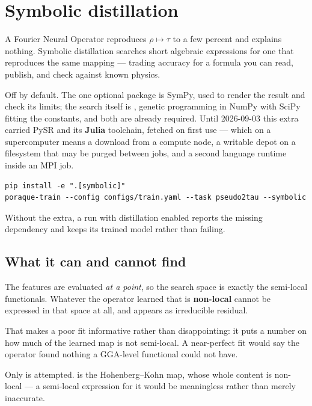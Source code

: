 \chapter{Symbolic distillation}
\label{ch:symbolic}

A Fourier Neural Operator reproduces $\rho \mapsto \tau$ to a few percent and
explains nothing. Symbolic distillation searches short algebraic expressions
for one that reproduces the same mapping --- trading accuracy for a formula you
can read, publish, and check against known physics.

\begin{pnote}
Off by default. The one optional package is SymPy, used to render the result and
check its limits; the search itself is , genetic programming
in NumPy with SciPy fitting the constants, and both are already required.
Until 2026-09-03 this extra carried PySR and its \textbf{Julia} toolchain,
fetched on first use --- which on a supercomputer means a download from a
compute node, a writable depot on a filesystem that may be purged between jobs,
and a second language runtime inside an MPI job.
\end{pnote}

\begin{lstlisting}
pip install -e ".[symbolic]"
poraque-train --config configs/train.yaml --task pseudo2tau --symbolic
\end{lstlisting}

Without the extra, a run with distillation enabled reports the missing
dependency and keeps its trained model rather than failing.

\section{What it can and cannot find}

The features are evaluated \emph{at a point}, so the search space is exactly
the semi-local functionals. Whatever the operator learned that is
\textbf{non-local} cannot be expressed in that space at all, and appears as
irreducible residual.

That makes a poor fit informative rather than disappointing: it puts a number
on how much of the learned map is not semi-local. A near-perfect fit would say
the operator found nothing a GGA-level functional could not have.

\begin{pnote}
Only  is attempted.  is the Hohenberg--Kohn map,
whose whole content is non-local --- a semi-local expression for it would be
meaningless rather than merely inaccurate.
\end{pnote}

